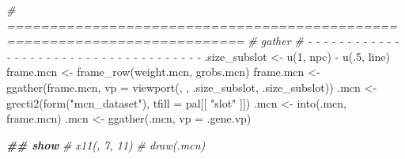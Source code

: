 \documentclass[
]{article}
\newenvironment{Shaded}{\begin{snugshade}}{\end{snugshade}}
\newcommand{\AttributeTok}[1]{\textcolor[rgb]{0.77,0.63,0.00}{#1}}
\newcommand{\CommentTok}[1]{\textcolor[rgb]{0.56,0.35,0.01}{\textit{#1}}}
\newcommand{\ControlFlowTok}[1]{\textcolor[rgb]{0.13,0.29,0.53}{\textbf{#1}}}
\newcommand{\DecValTok}[1]{\textcolor[rgb]{0.00,0.00,0.81}{#1}}
\newcommand{\DocumentationTok}[1]{\textcolor[rgb]{0.56,0.35,0.01}{\textbf{\textit{#1}}}}
\newcommand{\FloatTok}[1]{\textcolor[rgb]{0.00,0.00,0.81}{#1}}
\newcommand{\FunctionTok}[1]{\textcolor[rgb]{0.00,0.00,0.00}{#1}}
\newcommand{\NormalTok}[1]{#1}
\newcommand{\OtherTok}[1]{\textcolor[rgb]{0.56,0.35,0.01}{#1}}
\newcommand{\SpecialCharTok}[1]{\textcolor[rgb]{0.00,0.00,0.00}{#1}}
\newcommand{\StringTok}[1]{\textcolor[rgb]{0.31,0.60,0.02}{#1}}
\begin{document}
\begin{Shaded}
\end{Shaded}

\begin{Shaded}
\begin{Highlighting}[]
\CommentTok{\# ==========================================================================}
\CommentTok{\# gather}
\CommentTok{\# {-} {-} {-} {-} {-} {-} {-} {-} {-} {-} {-} {-} {-} {-} {-} {-} {-} {-} {-} {-} {-} {-} {-} {-} {-} {-} {-} {-} {-} {-} {-} {-} {-} {-} {-} {-} {-}}
\NormalTok{.size\_subslot }\OtherTok{\textless{}{-}} \FunctionTok{u}\NormalTok{(}\DecValTok{1}\NormalTok{, npc) }\SpecialCharTok{{-}} \FunctionTok{u}\NormalTok{(.}\DecValTok{5}\NormalTok{, line)}
\NormalTok{frame.mcn }\OtherTok{\textless{}{-}} \FunctionTok{frame\_row}\NormalTok{(weight.mcn, grobs.mcn)}
\NormalTok{frame.mcn }\OtherTok{\textless{}{-}} \FunctionTok{ggather}\NormalTok{(frame.mcn, }\AttributeTok{vp =} \FunctionTok{viewport}\NormalTok{(, , .size\_subslot, .size\_subslot))}
\NormalTok{.mcn }\OtherTok{\textless{}{-}} \FunctionTok{grecti2}\NormalTok{(}\FunctionTok{form}\NormalTok{(}\StringTok{"mcn\_dataset"}\NormalTok{), }\AttributeTok{tfill =}\NormalTok{ pal[[ }\StringTok{"slot"}\NormalTok{ ]])}
\NormalTok{.mcn }\OtherTok{\textless{}{-}} \FunctionTok{into}\NormalTok{(.mcn, frame.mcn)}
\NormalTok{.mcn }\OtherTok{\textless{}{-}} \FunctionTok{ggather}\NormalTok{(.mcn, }\AttributeTok{vp =}\NormalTok{ .gene.vp)}

\DocumentationTok{\#\# show}
\CommentTok{\# x11(, 7, 11)}
\CommentTok{\# draw(.mcn)}
\end{Highlighting}
\end{Shaded}
\end{document}
